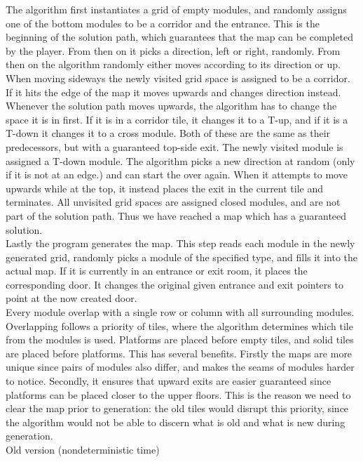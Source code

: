 The algorithm first instantiates a grid of empty modules, and randomly assigns one of the bottom modules to be a corridor and the entrance. This is the beginning of the solution path, which guarantees that the map can be completed by the player. From then on it picks a direction, left or right, randomly. From then on the algorithm randomly either moves according to its direction or up. When moving sideways the newly visited grid space is assigned to be a corridor. If it hits the edge of the map it moves upwards and changes direction instead. Whenever the solution path moves upwards, the algorithm has to change the space it is in first. If it is in a corridor tile, it changes it to a T-up, and if it is a T-down it changes it to a cross module. Both of these are the same as their predecessors, but with a guaranteed top-side exit. The newly visited module is assigned a T-down module. The algorithm picks a new direction at random (only if it is not at an edge.) and can start the over again. When it attempts to move upwards while at the top, it instead places the exit in the current tile and terminates. All unvisited grid spaces are assigned closed modules, and are not part of the solution path. Thus we have reached a map which has a guaranteed solution.\\
Lastly the program generates the map. This step reads each module in the newly generated grid, randomly picks a module of the specified type, and fills it into the actual map. If it is currently in an entrance or exit room, it places the corresponding door. It changes the original given entrance and exit pointers to point at the now created door.\\
Every module overlap with a single row or column with all surrounding modules. Overlapping follows a priority of tiles, where the algorithm determines which tile from the modules is used. Platforms are placed before empty tiles, and solid tiles are placed before platforms. This has several benefits. Firstly the maps are more unique since pairs of modules also differ, and makes the seams of modules harder to notice. Secondly, it ensures that upward exits are easier guaranteed since platforms can be placed closer to the upper floors. This is the reason we need to clear the map prior to generation: the old tiles would disrupt this priority, since the algorithm would not be able to discern what is old and what is new during generation.\\
Old version (nondeterministic time)

